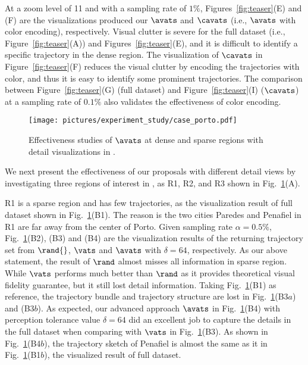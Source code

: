 At a zoom level of 11 and with a sampling rate of $1\%$, Figures~\ref{fig:teaser}(E) and (F) are the visualizations produced our $\avats$ and $\cavats$ (i.e., $\avats$ with color encoding), respectively.
Visual clutter is severe for the full dataset (i.e., Figure~\ref{fig:teaser}(A)) and Figures~\ref{fig:teaser}(E), and it is difficult to identify a specific trajectory in the dense region. The visualization of $\cavats$ in Figure~\ref{fig:teaser}(F) reduces the visual clutter by encoding the trajectories with color, and thus it is easy to identify some prominent trajectories. The comparison between Figure~\ref{fig:teaser}(G) (full dataset) and Figure~\ref{fig:teaser}(I)  ($\cavats$) at a sampling rate of $0.1\%$ also validates the effectiveness of color encoding.

\begin{figure*}[t]
	\centering
	\texttt{[image: pictures/experiment\_study/case\_porto.pdf]}
	\vspace{-3mm}
	\caption{Effectiveness studies of $\avats$ at dense and sparse regions with detail visualizations in \pt{}.}
	\label{fig:porto}
	\vspace{-2mm}
\end{figure*}

We next present the effectiveness of our proposals with different detail views by investigating three regions of interest in \pt{}, as R1, R2, and R3 shown in Fig.~\ref{fig:porto}(A).

R1 is a sparse region and has few trajectories, as the visualization result of full \pt{} dataset shown in Fig.~\ref{fig:porto}(B1).
The reason is the two cities Paredes and Penafiel in R1 are far away from the center of Porto.
Given sampling rate $\alpha=0.5\%$, Fig.~\ref{fig:porto}(B2), (B3) and (B4) are the visualization results of the returning trajectory set from $\rand{}$, $\vats$ and $\avats$ with $\delta=64$, respectively.
As our above statement, the result of $\rand$ almost misses all information in sparse region.
While $\vats$ performs much better than $\rand$ as it provides theoretical visual fidelity guarantee, but it still lost detail information.
Taking Fig.~\ref{fig:porto}(B1) as reference, the trajectory bundle and trajectory structure are lost in Fig.~\ref{fig:porto}(B3$a$) and (B3$b$).
As expected, our advanced approach $\avats$ in Fig.~\ref{fig:porto}(B4) with perception tolerance value $\delta=64$ did an excellent job to capture the details in the full dataset when comparing with $\vats$ in Fig.~\ref{fig:porto}(B3).
As shown in Fig.~\ref{fig:porto}(B4$b$), the trajectory sketch of Penafiel is almost the same as it in Fig.~\ref{fig:porto}(B1$b$), the visualized result of full dataset.



